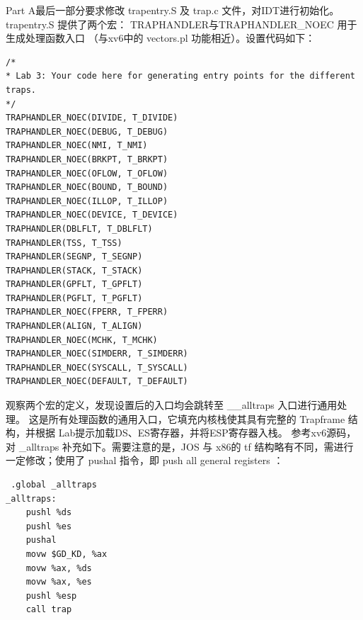 \documentclass[12pt, letterpaper]{report}
\begin{document}
Part A最后一部分要求修改 trapentry.S 及 trap.c 文件，对IDT进行初始化。 
trapentry.S 提供了两个宏： TRAPHANDLER与TRAPHANDLER\_NOEC 用于生成处理函数入口
（与xv6中的 vectors.pl 功能相近）。设置代码如下： 
\lstset{style=AssemblyStyle}
\setmainfont{Consolas}
\begin{lstlisting}
/*
* Lab 3: Your code here for generating entry points for the different traps.
*/
TRAPHANDLER_NOEC(DIVIDE, T_DIVIDE)
TRAPHANDLER_NOEC(DEBUG, T_DEBUG)
TRAPHANDLER_NOEC(NMI, T_NMI)
TRAPHANDLER_NOEC(BRKPT, T_BRKPT)
TRAPHANDLER_NOEC(OFLOW, T_OFLOW)
TRAPHANDLER_NOEC(BOUND, T_BOUND)
TRAPHANDLER_NOEC(ILLOP, T_ILLOP)
TRAPHANDLER_NOEC(DEVICE, T_DEVICE)
TRAPHANDLER(DBLFLT, T_DBLFLT)
TRAPHANDLER(TSS, T_TSS)
TRAPHANDLER(SEGNP, T_SEGNP)
TRAPHANDLER(STACK, T_STACK)
TRAPHANDLER(GPFLT, T_GPFLT)
TRAPHANDLER(PGFLT, T_PGFLT)
TRAPHANDLER_NOEC(FPERR, T_FPERR)
TRAPHANDLER(ALIGN, T_ALIGN)
TRAPHANDLER_NOEC(MCHK, T_MCHK)
TRAPHANDLER_NOEC(SIMDERR, T_SIMDERR)
TRAPHANDLER_NOEC(SYSCALL, T_SYSCALL)
TRAPHANDLER_NOEC(DEFAULT, T_DEFAULT)
\end{lstlisting}
\setmainfont{Times New Roman}
观察两个宏的定义，发现设置后的入口均会跳转至 \_\_alltraps 入口进行通用处理。
这是所有处理函数的通用入口，它填充内核栈使其具有完整的 Trapframe 结构，并根据
Lab提示加载DS、ES寄存器，并将ESP寄存器入栈。
参考xv6源码，对 \_alltraps 补充如下。需要注意的是，JOS 与
x86的 tf 结构略有不同，需进行一定修改；使用了 pushal 指令，即
push all general registers ：\par
\lstset{style=AssemblyStyle}
\setmainfont{Consolas}
\begin{lstlisting}
 .global _alltraps
_alltraps:
	pushl %ds
	pushl %es
	pushal
	movw $GD_KD, %ax
	movw %ax, %ds
	movw %ax, %es
	pushl %esp
	call trap
\end{lstlisting}
\setmainfont{Times New Roman}
\end{document}
